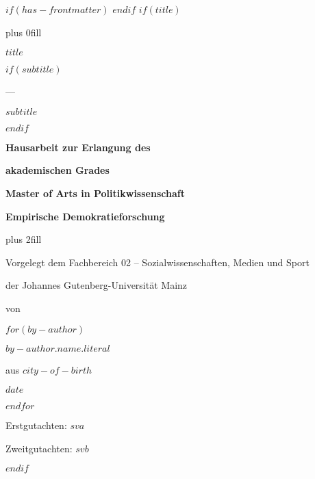 $if(has-frontmatter)$
\frontmatter
$endif$
$if(title)$
\cleardoublepage
\thispagestyle{empty}
{\centering
\hbox{}\vskip 0cm plus 0fill
{\large $title$ \par}
$if(subtitle)$
{\large --- \par}
{\large $subtitle$ \par}
$endif$
\vspace{40ex}
{\large\bfseries Hausarbeit zur Erlangung des \par}
{\large\bfseries akademischen Grades \par}
{\large\bfseries Master of Arts in Politikwissenschaft \par}
{\large\bfseries Empirische Demokratieforschung \par}
\vskip 0cm plus 2fill
{\large Vorgelegt dem Fachbereich 02 -- Sozialwissenschaften, Medien und Sport \par}
{\large der Johannes Gutenberg-Universität Mainz \par}
{\large von \par}
$for(by-author)$
{\large $by-author.name.literal$ \par}
{\large aus $city-of-birth$ \par}
{\large $date$ \par}
$endfor$%
}
\restoregeometry
\pagebreak
\thispagestyle{empty}
\vspace*{\fill}
{\large Erstgutachten: $sva$ \par}
{\large Zweitgutachten: $svb$ \par}
$endif$
\let\mainmatterreal\mainmatter
\let\mainmatter\relax